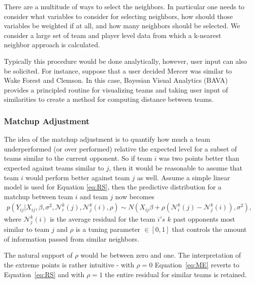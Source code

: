 There are a multitude of ways to select the neighbors.  In particular one needs to consider what variables to consider for selecting neighbors, how should those variables be weighted if at all, and how many neighbors should be selected.  We consider a large set of team and player level data from which a k-nearest neighbor approach is calculated.

Typically this procedure would be done analytically, however, user input can also be solicited.  For instance, suppose that a user decided Mercer was similar to Wake Forest and Clemson.  In this case, Bayesian Visual Analytics (BAVA) provides a principled routine for visualizing teams and taking user input of similarities to create a method for computing distance between teams.  
\subsubsection{Matchup Adjustment}
The idea of the matchup adjustment is to quantify how much a team underperformed (or over performed) relative the expected level for a subset of teams similar to the current opponent.  So if team $i$ was two points better than expected against teams similar to $j$, then it would be reasonable to assume that team $i$ would perform better against team $j$ as well.  Assume a simple linear model is used for Equation \ref{eq:RS}, then the predictive distribution for a matchup between team $i$ and team $j$ now becomes 
\begin{eqnarray}
p(Y_{ij}|X_{ij}, \beta,\sigma^2,\mathcal{N}_i^k(j),\mathcal{N}_j^k(i), \rho) \sim N(X_{ij} \beta + \rho(\mathcal{N}_i^k(j) -\mathcal{N}_j^k(i)), \sigma^2),
\label{eq:ME}
\end{eqnarray}
where $\mathcal{N}_j^k(i)$ is the average residual for the team $i's$ $k$ past opponents most similar to team $j$ and $\rho$ is a tuning parameter $\in [0,1]$ that controls the amount of information passed from similar neighbors. 

The natural support of $\rho$ would be between zero and one.  The interpretation of the extreme points is rather intuitive - with $\rho = 0$ Equation~\ref{eq:ME} reverts to Equation~\ref{eq:RS} and with $\rho = 1$ the entire residual for similar teams is retained. 
